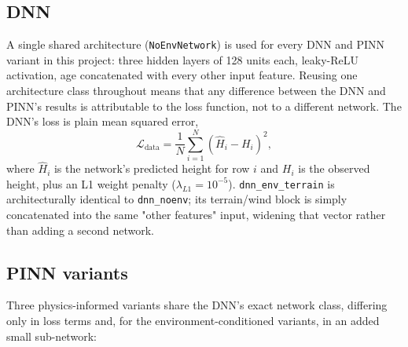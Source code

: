\documentclass[11pt,a4paper]{report}
\begin{document}
\subsection{DNN}

A single shared architecture (\texttt{NoEnvNetwork}) is used for every DNN and PINN variant in
this project: three hidden layers of 128 units each, leaky-ReLU activation, age concatenated with
every other input feature. Reusing one architecture class throughout means that any difference
between the DNN and PINN's results is attributable to the loss function, not to a different
network. The DNN's loss is plain mean squared error,
\begin{equation}
\mathcal{L}_{\text{data}} = \frac{1}{N}\sum_{i=1}^{N}\left(\hat H_i - H_i\right)^2,
\label{eq:data-loss}
\end{equation}
where $\hat H_i$ is the network's predicted height for row $i$ and $H_i$ is the observed height,
plus an L1 weight penalty ($\lambda_{L1}=10^{-5}$). \texttt{dnn\_env\_terrain} is architecturally
identical to \texttt{dnn\_noenv}; its terrain/wind block is simply concatenated into the same
"other features" input, widening that vector rather than adding a second network.

\subsection{PINN variants}

Three physics-informed variants share the DNN's exact network class, differing only in loss
terms and, for the environment-conditioned variants, in an added small sub-network:
\end{document}
